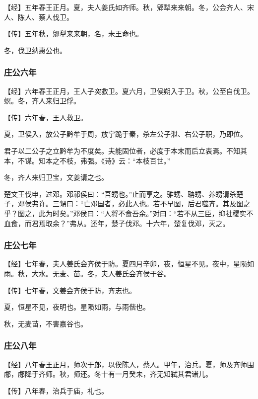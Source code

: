 \documentclass[]{article}
\begin{document}
【经】五年春王正月。夏，夫人姜氏如齐师。秋，郳犁来来朝。冬，公会齐人、宋人、陈人、蔡人伐卫。

【传】五年秋，郳犁来来朝，名，未王命也。

冬，伐卫纳惠公也。

\hypertarget{header-n387}{%
\subsubsection{庄公六年}\label{header-n387}}

【经】六年春王正月，王人子突救卫。夏六月，卫侯朔入于卫。秋，公至自伐卫。螟。冬，齐人来归卫俘。

【传】六年春，王人救卫。

夏，卫侯入，放公子黔牟于周，放宁跪于秦，杀左公子泄、右公子职，乃即位。

君子以二公子之立黔牟为不度矣。夫能固位者，必度于本末而后立衷焉。不知其本，不谋。知本之不枝，弗强。《诗》云：``本枝百世。''

冬，齐人来归卫宝，文姜请之也。

楚文王伐申，过邓。邓祁侯曰：``吾甥也。''止而享之。骓甥、聃甥、养甥请杀楚子，邓侯弗许。三甥曰：``亡邓国者，必此人也。若不早图，后君噬齐。其及图之乎？图之，此为时矣。''邓侯曰：``人将不食吾余。''对曰：``若不从三臣，抑社稷实不血食，而君焉取余？''弗从。还年，楚子伐邓。十六年，楚复伐邓，灭之。

\hypertarget{header-n396}{%
\subsubsection{庄公七年}\label{header-n396}}

【经】七年春，夫人姜氏会齐侯于防。夏四月辛卯，夜，恒星不见。夜中，星陨如雨。秋，大水。无麦、苗。冬，夫人姜氏会齐侯于谷。

【传】七年春，文姜会齐侯于防，齐志也。

夏，恒星不见，夜明也。星陨如雨，与雨偕也。

秋，无麦苗，不害嘉谷也。

\hypertarget{header-n403}{%
\subsubsection{庄公八年}\label{header-n403}}

【经】八年春王正月，师次于郎，以俟陈人，蔡人。甲午，治兵。夏，师及齐师围郕，郕降于齐师。秋，师还。冬十有一月癸未，齐无知弑其君诸儿。

【传】八年春，治兵于庙，礼也。
\end{document}
